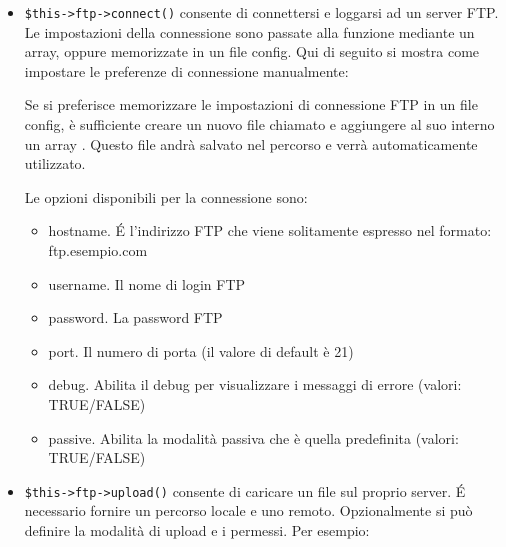 \begin{itemize}
\item \verb|$this->ftp->connect()| consente di connettersi e loggarsi ad un server FTP. Le impostazioni della connessione sono passate alla funzione mediante un array, oppure memorizzate in un file config. Qui di seguito si mostra come impostare le preferenze di connessione manualmente:


Se si preferisce memorizzare le impostazioni di connessione FTP in un file config, è sufficiente creare un nuovo file chiamato  e aggiungere al suo interno un array . Questo file andrà salvato nel percorso  e verrà automaticamente utilizzato.

Le opzioni disponibili per la connessione sono:

\begin{itemize}
\item hostname. \'E l'indirizzo FTP che viene solitamente espresso nel formato: ftp.esempio.com
\item username. Il nome di login FTP
\item password. La password FTP
\item port. Il numero di porta (il valore di default è 21)
\item debug. Abilita il debug per visualizzare i messaggi di errore (valori: TRUE/FALSE)
\item passive. Abilita la modalità passiva che è quella predefinita (valori: TRUE/FALSE)
\end{itemize}

\item \verb|$this->ftp->upload()| consente di caricare un file sul proprio server. \'E necessario fornire un percorso locale e uno remoto. Opzionalmente si può definire la modalità di upload e i permessi. Per esempio:



\end{itemize}
